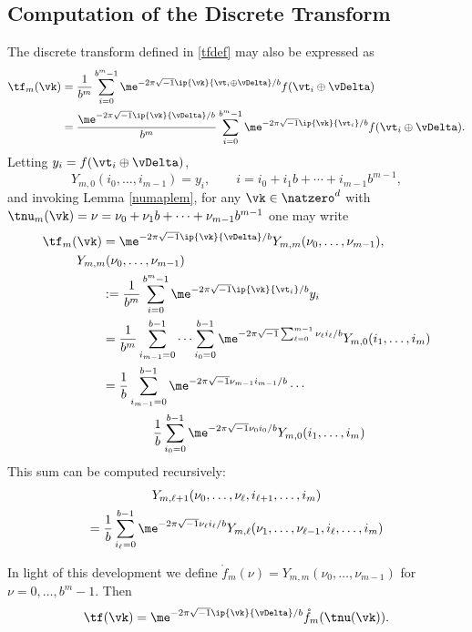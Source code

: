 \documentclass[]{elsarticle}
\theoremstyle{definition}
\renewcommand{\bbK}{\natzero^d}
\begin{document}
\subsection{Computation of the Discrete Transform}
The discrete transform defined in \eqref{tfdef} may also be expressed as
\begin{align}
\nonumber
\tf_m(\vk)
&= \frac{1}{b^m} \sum_{i=0}^{b^m-1} \me^{-2 \pi \sqrt{-1} \ip{\vk}{\vt_i\oplus \vDelta}/b} f(\vt_i\oplus \vDelta) \\
\nonumber
&= \frac{\me^{-2 \pi \sqrt{-1} \ip{\vk}{\vDelta}/b}}{b^m} \sum_{i=0}^{b^m-1} \me^{-2 \pi \sqrt{-1} \ip{\vk}{\vt_i}/b} f(\vt_i\oplus \vDelta).
\end{align}
Letting $y_i=f(\vt_i\oplus \vDelta)$,
\[
Y_{m,0}(i_0,\ldots, i_{m-1}) = y_i, \qquad i=i_0 + i_1 b + \cdots + i_{m-1} b^{m-1},
\]
and invoking Lemma \ref{numaplem}, for any $\vk \in \bbK$ with $\tnu_m(\vk)=\nu = \nu_0 + \nu_1 b  + \cdots + \nu_{m-1} b^{m-1}$ one may write
\begin{align}
\nonumber
\tf_m(\vk) &= \me^{-2 \pi \sqrt{-1} \ip{\vk}{\vDelta}/b}  Y_{m,m}(\nu_0, \ldots, \nu_{m-1}) , \\
\nonumber
\MoveEqLeft{Y_{m,m}(\nu_0, \ldots, \nu_{m-1})}\\
\nonumber
& : = \frac{1}{b^m} \sum_{i=0}^{b^m-1} \me^{-2 \pi \sqrt{-1} \ip{\vk}{\vt_i}/b} y_i \\
\nonumber
& = \frac{1}{b^m} \sum_{i_{m-1}=0}^{b-1} \cdots \sum_{i_0=0}^{b-1} \me^{-2 \pi \sqrt{-1} \sum_{\ell=0}^{m-1} \nu_\ell i_\ell/b} Y_{m,0}(i_1,\ldots, i_m) \\
\nonumber
& = \frac{1}{b} \sum_{i_{m-1}=0}^{b-1}\me^{-2 \pi \sqrt{-1} \nu_{m-1} i_{m-1}/b}  \cdots \\
&\qquad \qquad \frac{1}{b} \sum_{i_0=0}^{b-1} \me^{-2 \pi \sqrt{-1} \nu_0 i_0/b} Y_{m,0}(i_1,\ldots, i_m)
\nonumber
\end{align}
This sum can be computed recursively:
\begin{multline*}
Y_{m,\ell+1}(\nu_0, \ldots, \nu_{\ell},i_{\ell+1}, \ldots, i_m) \\
= \frac{1}{b} \sum_{i_\ell=0}^{b-1} \me^{-2 \pi \sqrt{-1} \nu_\ell i_\ell/b } Y_{m,\ell}(\nu_1, \ldots, \nu_{\ell-1},i_{\ell}, \ldots, i_m)
\end{multline*}

In light of this development we define $\mathring{f}_m(\nu)=Y_{m,m}(\nu_0, \ldots, \nu_{m-1})$ for $\nu=0, \ldots, b^{m}-1$. Then
\[
\tf(\vk) = \me^{-2 \pi \sqrt{-1} \ip{\vk}{\vDelta}/b} \mathring{f}_m(\tnu(\vk)).
\]
\end{document}
